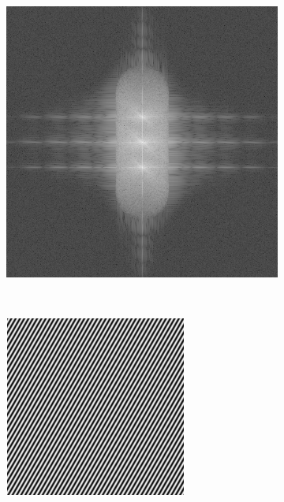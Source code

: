 \begin{figure}[h]
\begin{subfigure}[t]{0.23\textwidth}
      \caption{}
  \end{subfigure}\hfill
  \begin{subfigure}[t]{0.23\textwidth}
      \centering
      \includegraphics[width=\textwidth]{sim_slit/1/fft}
      \caption{}
  \end{subfigure}\\
  \begin{subfigure}[t]{0.23\textwidth}
      \centering
      \includegraphics[width=\textwidth]{sim_slit/2/angle_pattern}

\end{subfigure}
\end{figure}
